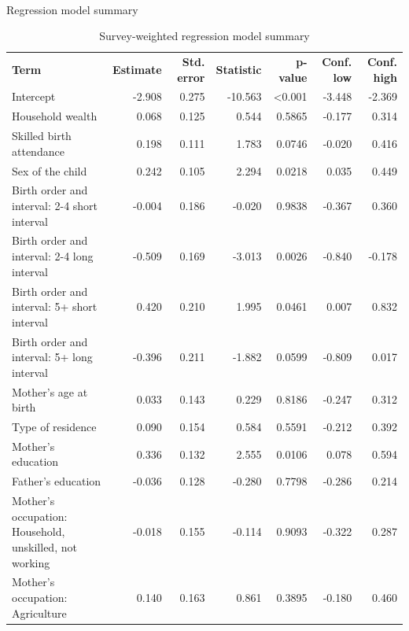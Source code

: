 \documentclass[
  11pt,
  a4paper,
]{article}
\makeatletter
\let\oldparagraph\paragraph
\renewcommand{\paragraph}{
    \@ifstar
      \xxxParagraphStar
      \xxxParagraphNoStar
  }
\newcommand{\xxxParagraphStar}[1]{\oldparagraph*{#1}\mbox{}}
\newcommand{\xxxParagraphNoStar}[1]{\oldparagraph{#1}\mbox{}}
\makeatother
\begin{document}
\paragraph{Regression model summary}\label{regression-model-summary}

\begingroup\fontsize{11}{13}\selectfont

\begin{longtable}[t]{>{\raggedleft\arraybackslash}p{4.5cm}rrrrrr}

\caption{\label{tbl-appendix-regression-model-summary}Survey-weighted
regression model summary}

\tabularnewline

\\
\toprule
\textbf{Term} & \textbf{Estimate} & \textbf{Std. error} & \textbf{Statistic} & \textbf{p-value} & \textbf{Conf. low} & \textbf{Conf. high}\\
\midrule
Intercept & -2.908 & 0.275 & -10.563 & <0.001 & -3.448 & -2.369\\
Household wealth & 0.068 & 0.125 & 0.544 & 0.5865 & -0.177 & 0.314\\
Skilled birth attendance & 0.198 & 0.111 & 1.783 & 0.0746 & -0.020 & 0.416\\
Sex of the child & 0.242 & 0.105 & 2.294 & 0.0218 & 0.035 & 0.449\\
Birth order and interval: 2-4 short interval & -0.004 & 0.186 & -0.020 & 0.9838 & -0.367 & 0.360\\
\addlinespace
Birth order and interval: 2-4 long interval & -0.509 & 0.169 & -3.013 & 0.0026 & -0.840 & -0.178\\
Birth order and interval: 5+ short interval & 0.420 & 0.210 & 1.995 & 0.0461 & 0.007 & 0.832\\
Birth order and interval: 5+ long interval & -0.396 & 0.211 & -1.882 & 0.0599 & -0.809 & 0.017\\
Mother's age at birth & 0.033 & 0.143 & 0.229 & 0.8186 & -0.247 & 0.312\\
Type of residence & 0.090 & 0.154 & 0.584 & 0.5591 & -0.212 & 0.392\\
\addlinespace
Mother's education & 0.336 & 0.132 & 2.555 & 0.0106 & 0.078 & 0.594\\
Father's education & -0.036 & 0.128 & -0.280 & 0.7798 & -0.286 & 0.214\\
Mother's occupation: Household, unskilled, not working & -0.018 & 0.155 & -0.114 & 0.9093 & -0.322 & 0.287\\
Mother's occupation: Agriculture & 0.140 & 0.163 & 0.861 & 0.3895 & -0.180 & 0.460\\

\end{longtable}
\end{document}
